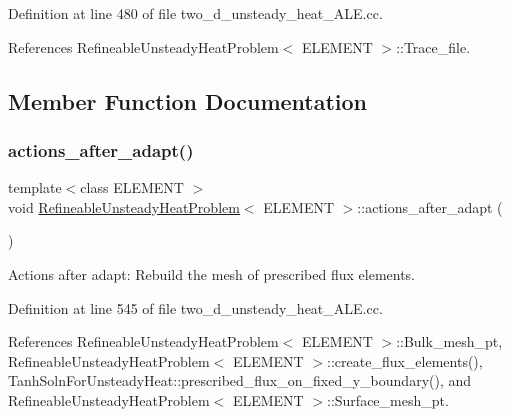 Definition at line 480 of file two\+\_\+d\+\_\+unsteady\+\_\+heat\+\_\+\+A\+L\+E.\+cc.



References Refineable\+Unsteady\+Heat\+Problem$<$ E\+L\+E\+M\+E\+N\+T $>$\+::\+Trace\+\_\+file.



\subsection{Member Function Documentation}
\mbox{\label{classRefineableUnsteadyHeatProblem_a1f8a9e91269440c799a2075f989d62b1}} 
\subsubsection{\texorpdfstring{actions\+\_\+after\+\_\+adapt()}{actions\_after\_adapt()}}
{\footnotesize\ttfamily template$<$class E\+L\+E\+M\+E\+NT $>$ \\
void \hyperlink{classRefineableUnsteadyHeatProblem}{Refineable\+Unsteady\+Heat\+Problem}$<$ E\+L\+E\+M\+E\+NT $>$\+::actions\+\_\+after\+\_\+adapt (\begin{DoxyParamCaption}{ }\end{DoxyParamCaption})}



Actions after adapt\+: Rebuild the mesh of prescribed flux elements. 



Definition at line 545 of file two\+\_\+d\+\_\+unsteady\+\_\+heat\+\_\+\+A\+L\+E.\+cc.



References Refineable\+Unsteady\+Heat\+Problem$<$ E\+L\+E\+M\+E\+N\+T $>$\+::\+Bulk\+\_\+mesh\+\_\+pt, Refineable\+Unsteady\+Heat\+Problem$<$ E\+L\+E\+M\+E\+N\+T $>$\+::create\+\_\+flux\+\_\+elements(), Tanh\+Soln\+For\+Unsteady\+Heat\+::prescribed\+\_\+flux\+\_\+on\+\_\+fixed\+\_\+y\+\_\+boundary(), and Refineable\+Unsteady\+Heat\+Problem$<$ E\+L\+E\+M\+E\+N\+T $>$\+::\+Surface\+\_\+mesh\+\_\+pt.

\mbox{\label{classRefineableUnsteadyHeatProblem_aa740f2eb1b3909100a04709b401c0b41}} 
